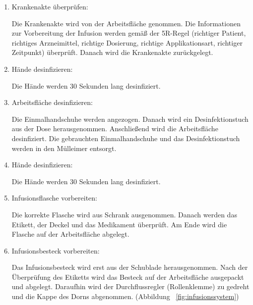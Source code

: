   \begin{enumerate}[start=0]
      \item Krankenakte überprüfen:
      
      Die Krankenakte wird von der Arbeitsfläche genommen. Die Informationen zur Vorbereitung der Infusion werden gemäß der 5R-Regel (richtiger Patient, richtiges Arzneimittel, richtige Dosierung, richtige Applikationsart, richtiger Zeitpunkt) überprüft. Danach wird die Krankenakte zurückgelegt.
      
      \item Hände desinfizieren:
      
      Die Hände werden 30 Sekunden lang desinfiziert.
      
      \item Arbeitsfläche desinfizieren:
      
      Die Einmalhandschuhe werden angezogen. Danach wird ein Desinfektionstuch aus der Dose herausgenommen. Anschließend wird die Arbeitsfläche desinfiziert. Die gebrauchten Einmalhandschuhe und das Desinfektionstuch werden in den Mülleimer entsorgt.
      
      \item Hände desinfizieren:
      
      Die Hände werden 30 Sekunden lang desinfiziert.
      
      \item Infusionsflasche vorbereiten:
      
      Die korrekte Flasche wird aus Schrank ausgenommen. Danach werden das Etikett, der Deckel und das Medikament überprüft. Am Ende wird die Flasche auf der Arbeitsfläche abgelegt.
      
      \item Infusionsbesteck vorbereiten:
      
      Das Infusionsbesteck wird erst aus der Schublade herausgenommen. Nach der Überprüfung des Etiketts wird das Besteck auf der Arbeitsfläche ausgepackt und abgelegt. Daraufhin wird der Durchflussregler (Rollenklemme) zu gedreht und die Kappe des Dorns abgenommen. (Abbildung ~\ref{fig:infusionssystem})
      

\end{enumerate}
